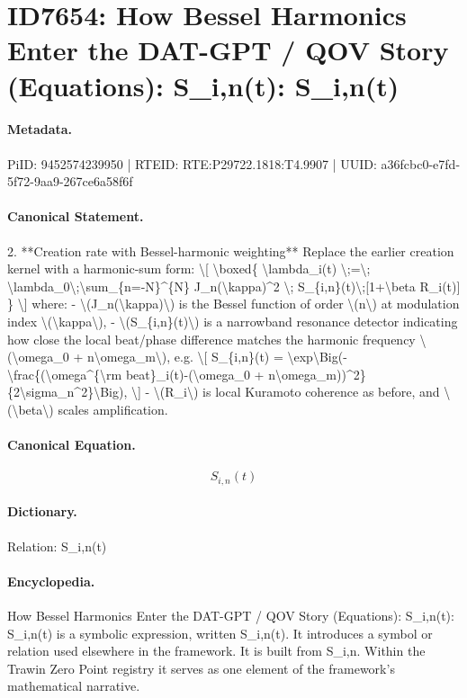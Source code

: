 \section*{ID7654: How Bessel Harmonics Enter the DAT-GPT / QOV Story (Equations): S\_i,n(t): S\_i,n(t)}
\paragraph{Metadata.}
PiID: 9452574239950 | RTEID: RTE:P29722.1818:T4.9907 | UUID: a36fcbc0-e7fd-5f72-9aa9-267ce6a58f6f

\paragraph{Canonical Statement.}
2. **Creation rate with Bessel-harmonic weighting** Replace the earlier creation kernel with a harmonic-sum form: \textbackslash{}[ \textbackslash{}boxed\{ \textbackslash{}lambda\_i(t) \textbackslash{};=\textbackslash{}; \textbackslash{}lambda\_0\textbackslash{};\textbackslash{}sum\_\{n=-N\}\textasciicircum{}\{N\} J\_n(\textbackslash{}kappa)\textasciicircum{}2 \textbackslash{}; S\_\{i,n\}(t)\textbackslash{};[1+\textbackslash{}beta R\_i(t)] \} \textbackslash{}] where: - \textbackslash{}(J\_n(\textbackslash{}kappa)\textbackslash{}) is the Bessel function of order \textbackslash{}(n\textbackslash{}) at modulation index \textbackslash{}(\textbackslash{}kappa\textbackslash{}), - \textbackslash{}(S\_\{i,n\}(t)\textbackslash{}) is a narrowband resonance detector indicating how close the local beat/phase difference matches the harmonic frequency \textbackslash{}(\textbackslash{}omega\_0 + n\textbackslash{}omega\_m\textbackslash{}), e.g. \textbackslash{}[ S\_\{i,n\}(t) = \textbackslash{}exp\textbackslash{}Big(-\textbackslash{}frac\{(\textbackslash{}omega\textasciicircum{}\{\textbackslash{}rm beat\}\_i(t)-(\textbackslash{}omega\_0 + n\textbackslash{}omega\_m))\textasciicircum{}2\}\{2\textbackslash{}sigma\_n\textasciicircum{}2\}\textbackslash{}Big), \textbackslash{}] - \textbackslash{}(R\_i\textbackslash{}) is local Kuramoto coherence as before, and \textbackslash{}(\textbackslash{}beta\textbackslash{}) scales amplification.

\paragraph{Canonical Equation.}
\[
S_{i,n}(t)
\]

\paragraph{Dictionary.}
Relation: S\_i,n(t)

\paragraph{Encyclopedia.}
How Bessel Harmonics Enter the DAT-GPT / QOV Story (Equations): S\_i,n(t): S\_i,n(t) is a symbolic expression, written S\_i,n(t). It introduces a symbol or relation used elsewhere in the framework. It is built from S\_i,n. Within the Trawin Zero Point registry it serves as one element of the framework's mathematical narrative.
